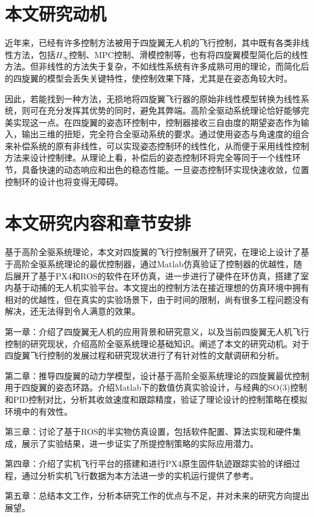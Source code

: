 \section{本文研究动机}
近年来，已经有许多控制方法被用于四旋翼无人机的飞行控制，其中既有各类非线性方法，包括$H_\infty$控制\cite{H}、MPC控制\cite{MPC}、滑模控制\cite{sliding}等，也有将四旋翼模型简化后的线性方法\cite{boua2007}。但非线性的方法失于复杂，不如线性系统有许多成熟可用的理论，而简化后的四旋翼的模型会丢失关键特性，使控制效果下降，尤其是在姿态角较大时。

因此，若能找到一种方法，无损地将四旋翼飞行器的原始非线性模型转换为线性系统，则可在充分发挥其优势的同时，避免其弊端。高阶全驱动系统理论恰好能够完美实现这一点。在四旋翼的姿态环控制中，控制器接收三自由度的期望姿态作为输入，输出三维的扭矩，完全符合全驱动系统的要求。通过使用姿态与角速度的组合来补偿系统的原有非线性，可以实现姿态控制环的线性化，从而便于采用线性控制方法来设计控制律。从理论上看，补偿后的姿态控制环将完全等同于一个线性环节，具备快速的动态响应和出色的稳态性能。一旦姿态控制环实现快速收敛，位置控制环的设计也将变得无障碍。
\section{本文研究内容和章节安排}
基于高阶全驱系统理论，本文对四旋翼的飞行控制展开了研究，在理论上设计了基于高阶全驱系统理论的最优控制器，通过Matlab仿真验证了控制器的优越性，随后展开了基于PX4和ROS的软件在环仿真，进一步进行了硬件在环仿真，搭建了室内基于动捕的无人机实验平台。本文提出的控制方法在接近理想的仿真环境中拥有相对的优越性，但在真实的实验场景下，由于时间的限制，尚有很多工程问题没有解决，还无法得到令人满意的效果。

第一章：介绍了四旋翼无人机的应用背景和研究意义，以及当前四旋翼无人机飞行控制的研究现状，介绍高阶全驱系统理论基础知识。阐述了本文的研究动机。对于四旋翼飞行控制的发展过程和研究现状进行了有针对性的文献调研和分析。

第二章：推导四旋翼的动力学模型，设计基于高阶全驱系统理论的四旋翼最优控制用于四旋翼的姿态环路。介绍Matlab下的数值仿真实验设计，与经典的SO(3)控制和PID控制对比，分析其收敛速度和跟踪精度，验证了理论设计的控制策略在模拟环境中的有效性。

第三章：讨论了基于ROS的半实物仿真设置，包括软件配置、算法实现和硬件集成，展示了实验结果，进一步证实了所提控制策略的实际应用潜力。

第四章：介绍了实机飞行平台的搭建和进行PX4原生固件轨迹跟踪实验的详细过程，通过分析实机飞行数据为本方法进一步的实机运行提供了参考。

第五章：总结本文工作，分析本研究工作的优点与不足，并对未来的研究方向提出展望。